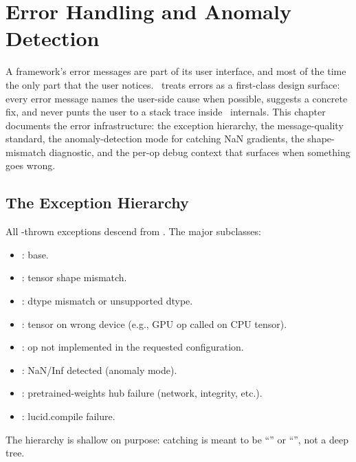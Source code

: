 \chapter{Error Handling and Anomaly Detection}
\label{ch:error_handling}

A framework's error messages are part of its user interface,
and most of the time the only part that the user notices.
\Lucid\ treats errors as a first-class design surface: every
error message names the user-side cause when possible, suggests
a concrete fix, and never punts the user to a stack trace inside
\Lucid\ internals. This chapter documents the error
infrastructure: the exception hierarchy, the message-quality
standard, the anomaly-detection mode for catching NaN
gradients, the shape-mismatch diagnostic, and the per-op
debug context that surfaces when something goes wrong.

\section{The Exception Hierarchy}
\label{sec:error_handling:hierarchy}

All \Lucid-thrown exceptions descend from .
The major subclasses:

\begin{itemize}
  \item {}: base.
  \item {}: tensor shape
    mismatch.
  \item {}: dtype mismatch or
    unsupported dtype.
  \item {}: tensor on wrong
    device (e.g., GPU op called on CPU tensor).
  \item {}: op not
    implemented in the requested configuration.
  \item {}: NaN/Inf detected (anomaly
    mode).
  \item {}: pretrained-weights hub
    failure (network, integrity, etc.).
  \item {}: lucid.compile failure.
\end{itemize}

The hierarchy is shallow on purpose: catching is meant to be
``'' or
``'', not a deep tree.

